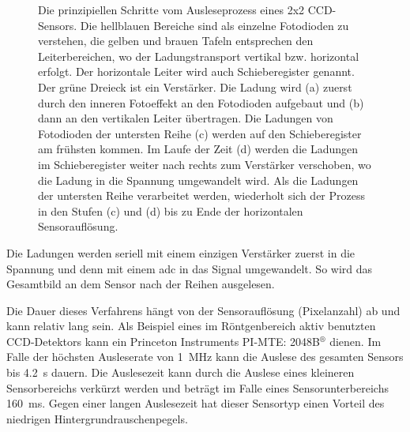 \begin{figure}[H]
    \caption{Die prinzipiellen Schritte vom Ausleseprozess eines 2x2 CCD-Sensors. Die hellblauen Bereiche sind als einzelne Fotodioden zu verstehen, die gelben und brauen Tafeln entsprechen den Leiterbereichen, wo der Ladungstransport vertikal bzw. horizontal erfolgt. Der horizontale Leiter wird auch Schieberegister genannt. Der grüne Dreieck ist ein Verstärker. Die Ladung wird (a) zuerst durch den inneren Fotoeffekt an den Fotodioden aufgebaut und (b) dann an den vertikalen Leiter übertragen. Die Ladungen von Fotodioden der untersten Reihe (c) werden auf den Schieberegister am frühsten kommen. Im Laufe der Zeit (d) werden die Ladungen im Schieberegister weiter nach rechts zum Verstärker verschoben, wo die Ladung in die Spannung umgewandelt wird. Als die Ladungen der untersten Reihe verarbeitet werden, wiederholt sich der Prozess in den Stufen (c) und (d) bis zu Ende der horizontalen Sensorauflösung.}
    \label{fig:ccd_scheme}
\end{figure}
\noindent
Die Ladungen werden seriell mit einem einzigen Verstärker zuerst in die Spannung und denn mit einem \gls{adc} in das Signal umgewandelt. So wird das Gesamtbild an dem Sensor nach der Reihen ausgelesen.

\noindent
Die Dauer dieses Verfahrens hängt von der Sensorauflösung (Pixelanzahl) ab und kann relativ lang sein. Als Beispiel eines im Röntgenbereich aktiv benutzten CCD-Detektors kann ein Princeton Instruments
PI-MTE: 2048B$^{\text{®}}$ dienen. Im Falle der höchsten Ausleserate von \SI{1}{\mega\hertz} \cite[s. 81, Readout charakterstik]{mte-manual} kann die Auslese des gesamten Sensors  bis \SI{4,2}{\second} dauern. Die Auslesezeit kann  durch die Auslese eines kleineren Sensorbereichs verkürzt werden und beträgt im Falle eines  Sensorunterbereichs \SI{160}{\milli\second}. Gegen einer langen Auslesezeit hat dieser Sensortyp einen Vorteil des niedrigen Hintergrundrauschenpegels.

